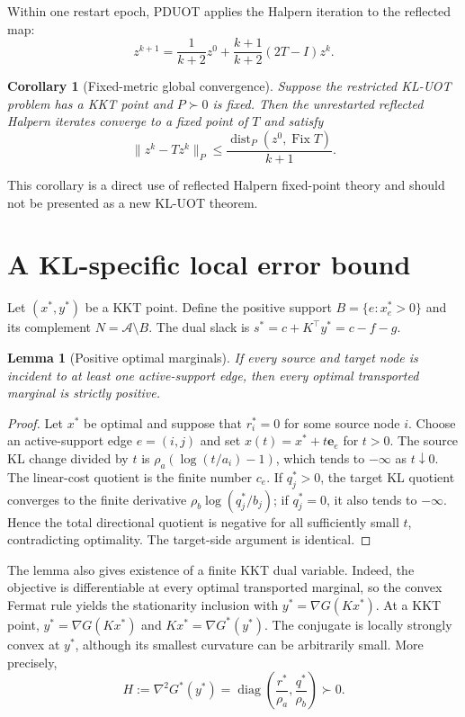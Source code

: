 \documentclass[11pt]{article}
\newtheorem{lemma}{Lemma}
\newtheorem{corollary}{Corollary}
\newcommand{\dist}{\operatorname{dist}}
\newcommand{\Fix}{\operatorname{Fix}}
\begin{document}
Within one restart epoch, PDUOT applies the Halpern iteration to the reflected map:
$$z^{k+1}=\frac{1}{k+2}z^0+\frac{k+1}{k+2}(2T-I)z^k.$$

\begin{corollary}[Fixed-metric global convergence]
Suppose the restricted KL-UOT problem has a KKT point and $P\succ0$ is fixed.
Then the unrestarted reflected Halpern iterates converge to a fixed point of $T$ and satisfy
$$\lVert z^k-Tz^k\rVert_P\leq\frac{\dist_P(z^0,\Fix T)}{k+1}.$$
\end{corollary}

This corollary is a direct use of reflected Halpern fixed-point theory and should not be presented as a new KL-UOT theorem.

\section{A KL-specific local error bound}

Let $(x^*,y^*)$ be a KKT point.
Define the positive support $B=\{e:x_e^*>0\}$ and its complement $N=\mathcal A\setminus B$.
The dual slack is $s^*=c+K^\top y^*=c-f-g$.

\begin{lemma}[Positive optimal marginals]
If every source and target node is incident to at least one active-support edge, then every optimal transported marginal is strictly positive.
\end{lemma}

\begin{proof}
Let $x^*$ be optimal and suppose that $r_i^*=0$ for some source node $i$.
Choose an active-support edge $e=(i,j)$ and set $x(t)=x^*+t\mathbf e_e$ for $t>0$.
The source KL change divided by $t$ is $\rho_a(\log(t/a_i)-1)$, which tends to $-\infty$ as $t\downarrow0$.
The linear-cost quotient is the finite number $c_e$.
If $q_j^*>0$, the target KL quotient converges to the finite derivative $\rho_b\log(q_j^*/b_j)$; if $q_j^*=0$, it also tends to $-\infty$.
Hence the total directional quotient is negative for all sufficiently small $t$, contradicting optimality.
The target-side argument is identical.
\end{proof}

The lemma also gives existence of a finite KKT dual variable.
Indeed, the objective is differentiable at every optimal transported marginal, so the convex Fermat rule yields the stationarity inclusion with $y^*=\nabla G(Kx^*)$.
At a KKT point, $y^*=\nabla G(Kx^*)$ and $Kx^*=\nabla G^*(y^*)$.
The conjugate is locally strongly convex at $y^*$, although its smallest curvature can be arbitrarily small.
More precisely,
$$H:=\nabla^2G^*(y^*)=\operatorname{diag}\left(\frac{r^*}{\rho_a},\frac{q^*}{\rho_b}\right)\succ0.$$
\end{document}
